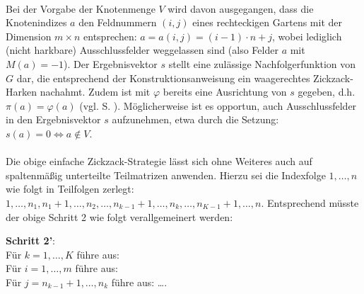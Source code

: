 \phantom \\
\noindent Bei der Vorgabe der Knotenmenge $V$ wird davon ausgegangen, dass die Knotenindizes $a$ den Feldnummern $(i,j)$ eines rechteckigen Gartens mit der Dimension $m \times n$ entsprechen: $a = a(i,j) = (i-1) \cdot n + j$, wobei lediglich (nicht harkbare) Ausschlussfelder weggelassen sind (also Felder $a$ mit $M(a)=-1$). Der Ergebnisvektor $s$ stellt eine zulässige Nachfolgerfunktion von $G$ dar, die entsprechend der Konstruktionsanweisung ein waagerechtes Zickzack-Harken nachahmt. Zudem ist mit $\varphi$ bereits eine Ausrichtung von $s$ gegeben, d.h. $\pi(a) = \varphi(a)$ (vgl. S. \pageref{Ausrichtung}). Möglicherweise ist es opportun, auch Ausschlussfelder in den Ergebnisvektor $s$ aufzunehmen, etwa durch die Setzung: $s(a)=0 \Leftrightarrow a \notin V$.\\
\\
Die obige einfache Zickzack-Strategie lässt sich ohne Weiteres auch auf spaltenmäßig unterteilte Teilmatrizen anwenden. Hierzu sei die Indexfolge $1,\dots,n$ wie folgt in Teilfolgen zerlegt:
$1,\dots,n_1,n_1+1,\dots,n_2,\dots,n_{k-1}+1,\dots,n_k,\dots,n_{K-1}+1,\dots,n$. Entsprechend müsste der obige Schritt 2 wie folgt verallgemeinert werden:

\noindent \textbf{Schritt 2'}:\\
\phantom \quad Für $k=1,\dots,K$ führe aus:\\
\phantom \quad \qquad Für $i=1,\dots,m$ führe aus:\\
\phantom \quad \qquad \qquad Für $j=n_{k-1}+1,\dots,n_k$ führe aus: \dots.

